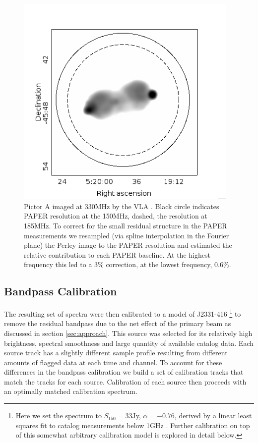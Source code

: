 \documentclass[preprint]{aastex}
\begin{document}
\begin{figure}
\includegraphics[width=0.96\textwidth]{plots/picA_Perley.png}
\caption{
Pictor A imaged at 330MHz by the VLA \citep{Perley:1997p9312}. Black circle
indicates PAPER resolution at the 150MHz, dashed, the resolution at 185MHz.  To
correct for the small residual structure in the PAPER measurements we resampled 
(via spline interpolation in the Fourier plane)
the Perley image to the PAPER resolution and estimated the relative contribution
 to each PAPER baseline.  At the highest frequency this
led to a 3\% correction, at the lowest frequency, 0.6\%.
\label{fig:pic_perley}}
\end{figure}

\subsection{Bandpass Calibration}
\label{sec:Calibration}

The resulting set of spectra were then calibrated to a model of J2331-416
\footnote{Here we set the spectrum to $S_{150}=33$Jy, $\alpha=-0.76$, derived by a linear least squares fit to
catalog measurements below 1GHz \citep{Slee:1995p7541,Kuehr:1981p9628,Large:1981p7798,Burgess:2006p7814}.  Further calibration on top of this somewhat arbitrary calibration model
is explored in detail below. }
 to remove 
the residual bandpass due to the net effect of the primary beam as discussed in section \ref{sec:approach}. 
This source
was selected for its relatively high brightness, spectral smoothness and large quantity
 of available catalog data. Each source track has a slightly different sample profile
 resulting from different amounts of flagged data at each time and channel. To account
 for these differences in the bandpass calibration we build a set of calibration tracks 
 that match the tracks for each source. Calibration of each source then proceeds with
 an optimally matched calibration spectrum.
\end{document}
